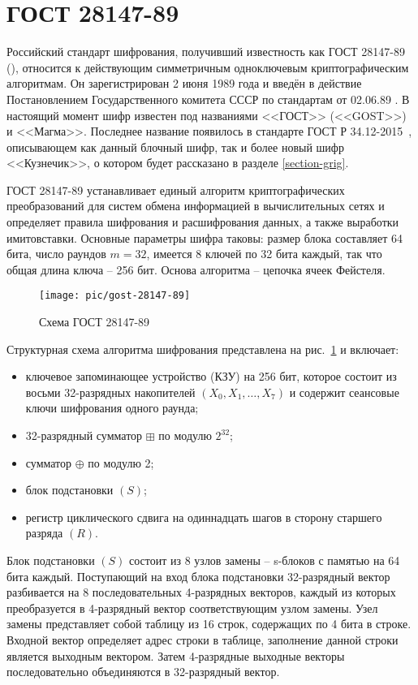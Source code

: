 \section{ГОСТ 28147-89}

Российский стандарт шифрования, получивший известность как ГОСТ 28147-89 (\cite{GOST-89}), относится к действующим симметричным одноключевым криптографическим алгоритмам. Он зарегистрирован 2 июня 1989 года и введён в действие Постановлением Государственного комитета СССР по стандартам от 02.06.89 . В настоящий момент шифр известен под названиями <<ГОСТ>> (<<GOST>>) и <<Магма>>. Последнее название появилось в стандарте ГОСТ Р 34.12-2015~\cite{GOST-R:34.12-2015}, описывающем как данный блочный шифр, так и более новый шифр <<Кузнечик>>, о котором будет рассказано в разделе \ref{section-grig}.

ГОСТ 28147-89 устанавливает единый алгоритм криптографических преобразований для систем обмена информацией в вычислительных сетях и определяет правила шифрования и расшифрования данных, а также выработки имитовставки. Основные параметры шифра таковы: размер блока составляет 64 бита, число раундов $m=32$, имеется 8 ключей по 32 бита каждый, так что общая длина ключа -- 256 бит. Основа алгоритма -- цепочка ячеек Фейстеля.

\begin{figure}[!ht]
    \centering
    \texttt{[image: pic/gost-28147-89]}
    \caption{Схема ГОСТ 28147-89\label{fig:gost-28147-89}}
\end{figure}

Структурная схема алгоритма шифрования представлена на рис.~\ref{fig:gost-28147-89} и включает:
\begin{itemize}
    \item ключевое запоминающее устройство (КЗУ) на 256 бит, которое состоит из восьми 32-разрядных накопителей $(X_0, X_1, \dots, X_7)$ и содержит сеансовые ключи шифрования одного раунда;
    \item 32-разрядный сумматор $\boxplus$ по модулю $2^{32}$;
    \item сумматор $\oplus$ по модулю 2;
    \item блок подстановки $(S)$;
    \item регистр циклического сдвига на одиннадцать шагов в сторону старшего разряда $(R)$.
\end{itemize}

Блок подстановки $(S)$ состоит из 8 узлов замены -- s-блоков с памятью на 64 бита каждый. Поступающий на вход блока подстановки 32-разрядный вектор разбивается на 8 последовательных 4-разрядных векторов, каждый из которых преобразуется в 4-разрядный вектор соответствующим узлом замены. Узел замены представляет собой таблицу из 16 строк, содержащих по 4 бита в строке. Входной вектор определяет адрес строки в таблице, заполнение данной строки является выходным вектором. Затем 4-разрядные выходные векторы последовательно объединяются в 32-разрядный вектор.

